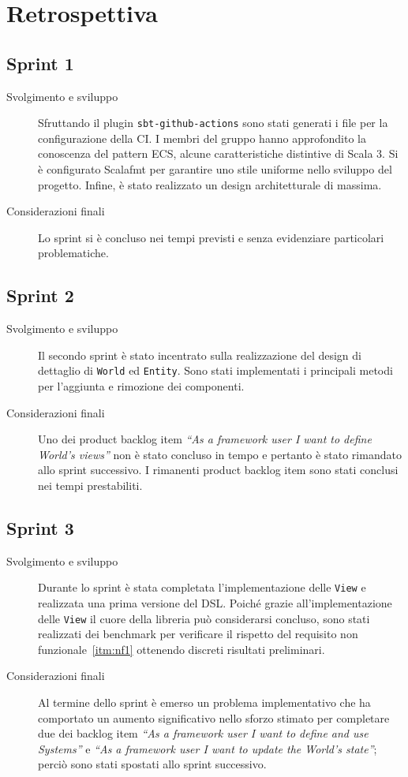 \chapter{Retrospettiva}\label{ch:retrospettiva}
\section{Sprint 1}\label{sec:sprint-1}
\begin{description}
    \item [Svolgimento e sviluppo] Sfruttando il plugin \texttt{sbt-github-actions} sono stati generati i file per la
    configurazione della CI\@.
    I membri del gruppo hanno approfondito la conoscenza del pattern ECS, alcune caratteristiche distintive di Scala 3.
    Si è configurato Scalafmt per garantire uno stile uniforme nello sviluppo del progetto.
    Infine, è stato realizzato un design architetturale di massima.
    \item [Considerazioni finali] Lo sprint si è concluso nei tempi previsti e senza evidenziare particolari
    problematiche.
\end{description}
\section{Sprint 2}\label{sec:sprint-2}
\begin{description}
    \item[Svolgimento e sviluppo] Il secondo sprint è stato incentrato sulla realizzazione del design di dettaglio di
    \texttt{World} ed \texttt{Entity}.
    Sono stati implementati i principali metodi per l'aggiunta e rimozione dei componenti.
    \item[Considerazioni finali] Uno dei product backlog item
    \textit{``As a framework user I want to define World's views''} non è stato concluso in tempo e pertanto è stato
    rimandato allo sprint successivo.
    I rimanenti product backlog item sono stati conclusi nei tempi prestabiliti.
\end{description}
\section{Sprint 3}\label{sec:sprint-3}
\begin{description}
    \item[Svolgimento e sviluppo] Durante lo sprint è stata completata l'implementazione delle \texttt{View} e
    realizzata una prima versione del DSL\@.
    Poiché grazie all'implementazione delle \texttt{View} il cuore della libreria può considerarsi concluso, sono stati
    realizzati dei benchmark per verificare il rispetto del requisito non funzionale~\ref{itm:nf1} ottenendo discreti
    risultati preliminari.
    \item[Considerazioni finali] Al termine dello sprint è emerso un problema implementativo che ha comportato un
    aumento significativo nello sforzo stimato per completare due dei backlog item
    \textit{``As a framework user I want to define and use Systems''} e
    \textit{``As a framework user I want to update the World's state''};
    perciò sono stati spostati allo sprint successivo.
\end{description}
